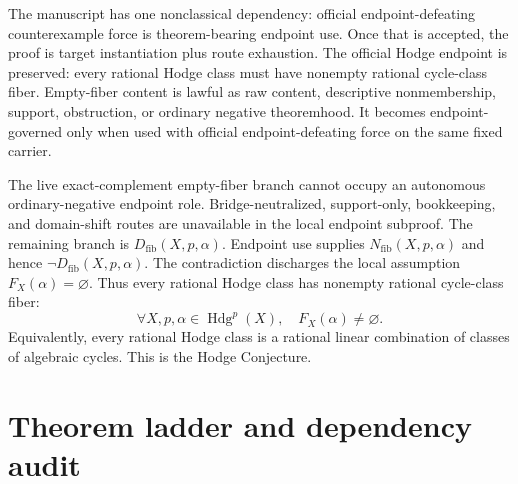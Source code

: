 \documentclass[11pt]{article}
\newcommand{\Hdg}{\operatorname{Hdg}}
\begin{document}
The manuscript has one nonclassical dependency: official endpoint-defeating counterexample force is theorem-bearing endpoint use. Once that is accepted, the proof is target instantiation plus route exhaustion. The official Hodge endpoint is preserved: every rational Hodge class must have nonempty rational cycle-class fiber. Empty-fiber content is lawful as raw content, descriptive nonmembership, support, obstruction, or ordinary negative theoremhood. It becomes endpoint-governed only when used with official endpoint-defeating force on the same fixed carrier.

The live exact-complement empty-fiber branch cannot occupy an autonomous ordinary-negative endpoint role. Bridge-neutralized, support-only, bookkeeping, and domain-shift routes are unavailable in the local endpoint subproof. The remaining branch is $D_{\mathrm{fib}}(X,p,\alpha)$. Endpoint use supplies $N_{\mathrm{fib}}(X,p,\alpha)$ and hence $\neg D_{\mathrm{fib}}(X,p,\alpha)$. The contradiction discharges the local assumption $F_X(\alpha)=\varnothing$. Thus every rational Hodge class has nonempty rational cycle-class fiber:
\[
\forall X,p,\alpha\in\Hdg^p(X),\quad F_X(\alpha)\neq\varnothing.
\]
Equivalently, every rational Hodge class is a rational linear combination of classes of algebraic cycles. This is the Hodge Conjecture.


\appendix

\section{Theorem ladder and dependency audit}\label{app:theorem-ladder}
\end{document}
